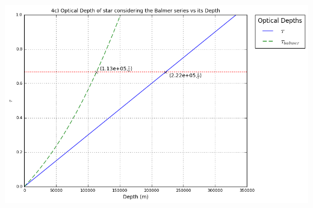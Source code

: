 \documentclass[letter,10pt]{article}
\begin{document}
\includegraphics[scale=0.8]{a2q4c.png}
\end{document}
